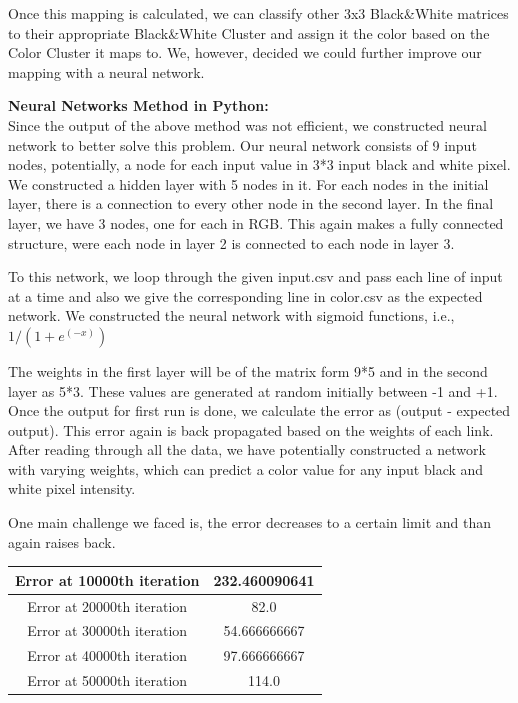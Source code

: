\documentclass[a4paper]{article}
\begin{document}
\begin{enumerate}
Once this mapping is calculated, we can classify other 3x3 Black\&White matrices to their appropriate Black\&White Cluster and assign it the color based on the Color Cluster it maps to.
We, however, decided we could further improve our mapping with a neural network.

\textbf{Neural Networks Method in Python:}\\
Since the output of the above method was not efficient, we constructed neural network to better solve this problem. Our neural network consists of 9 input nodes, potentially, a node for each input value in 3*3 input black and white pixel. We constructed a hidden layer with 5 nodes in it. For each nodes in the initial layer, there is a connection to every other node in the second layer. In the final layer, we have 3 nodes, one for each in RGB. This again makes a fully connected structure, were each node in layer 2 is connected to each node in layer 3.

To this network, we loop through the given input.csv and pass each line of input at a time and also we give the corresponding line in color.csv as the expected network. We constructed the neural network with sigmoid functions, i.e., $1/(1+e^{(-x)})$

The weights in the first layer will be of the matrix form 9*5 and in the second layer as 5*3. These values are generated at random initially between -1 and +1. Once the output for first run is done, we calculate the error as (output - expected output). This error again is back propagated based on the weights of each link. After reading through all the data, we have potentially constructed a network with varying weights, which can predict a color value for any input black and white pixel intensity.

One main challenge we faced is, the error decreases to a certain limit and than again raises back. 
\begin{center}
\begin{tabular}{|c|c|}
\hline
Error at 10000th iteration & 232.460090641\\
\hline
Error at 20000th iteration & 82.0\\
\hline
Error at 30000th iteration & 54.666666667\\
\hline
Error at 40000th iteration & 97.666666667\\
\hline
Error at 50000th iteration & 114.0\\
\hline
\end{tabular}
\end{center}


\end{enumerate}
\end{document}
